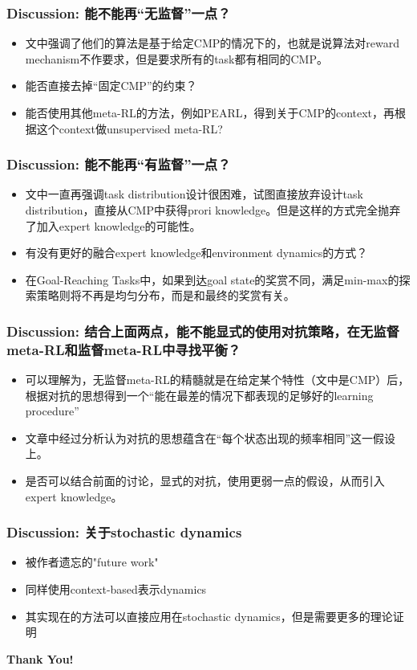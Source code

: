 \documentclass[aspectratio=169]{beamer}
\newcommand{\xmark}{\ding{55}}%
\begin{document}
\begin{frame}
  \frametitle{Discussion: 能不能再“无监督”一点？}
  \begin{itemize}
    \item 文中强调了他们的算法是基于给定CMP的情况下的，也就是说算法对reward mechanism不作要求，但是要求所有的task都有相同的CMP。
    \item 能否直接去掉“固定CMP”的约束？\xmark
    \item 能否使用其他meta-RL的方法，例如PEARL，得到关于CMP的context，再根据这个context做unsupervised meta-RL?
  \end{itemize}
\end{frame}

\begin{frame}
  \frametitle{Discussion: 能不能再“有监督”一点？}
  \begin{itemize}
    \item 文中一直再强调task distribution设计很困难，试图直接放弃设计task distribution，直接从CMP中获得prori knowledge。但是这样的方式完全抛弃了加入expert knowledge的可能性。
    \item 有没有更好的融合expert knowledge和environment dynamics的方式？
    \item 在Goal-Reaching Tasks中，如果到达goal state的奖赏不同，满足min-max的探索策略则将不再是均匀分布，而是和最终的奖赏有关。
  \end{itemize}
\end{frame}

\begin{frame}
  \frametitle{Discussion: 结合上面两点，能不能显式的使用对抗策略，在无监督meta-RL和监督meta-RL中寻找平衡？}
  \begin{itemize}
    \item 可以理解为，无监督meta-RL的精髓就是在给定某个特性（文中是CMP）后，根据对抗的思想得到一个“能在最差的情况下都表现的足够好的learning procedure”
    \item 文章中经过分析认为对抗的思想蕴含在“每个状态出现的频率相同”这一假设上。
    \item 是否可以结合前面的讨论，显式的对抗，使用更弱一点的假设，从而引入expert knowledge。
  \end{itemize}
\end{frame}

\begin{frame}
  \frametitle{Discussion: 关于stochastic dynamics}
  \begin{itemize}
    \item 被作者遗忘的"future work"
    \item 同样使用context-based表示dynamics
    \item 其实现在的方法可以直接应用在stochastic dynamics，但是需要更多的理论证明
  \end{itemize}
\end{frame}

\begin{frame}

\centering
\textbf{Thank You!}

\end{frame}
\end{document}
